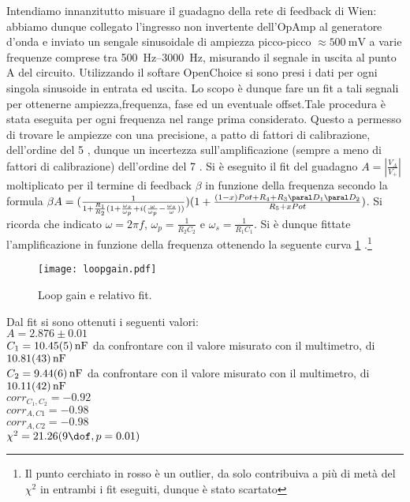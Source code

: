 Intendiamo innanzitutto misuare il guadagno della rete di feedback di Wien: abbiamo dunque collegato l'ingresso
non invertente dell'OpAmp al generatore d'onda e inviato un sengale sinusoidale di ampiezza picco-picco $\approx \SI{500}{\mV}$
a varie frequenze comprese tra \SIrange[range-phrase = \text{ e }]{500}{3000}{\Hz},
misurando il segnale in uscita al punto A del circuito. Utilizzando il softare OpenChoice si sono presi i dati per ogni singola sinusoide in entrata ed uscita. Lo scopo è dunque fare un fit a tali segnali per ottenerne ampiezza,frequenza, fase ed un eventuale offset.Tale procedura è stata eseguita per ogni frequenza nel range prima considerato. Questo a permesso di trovare le ampiezze con una precisione, a patto di fattori di calibrazione, dell'ordine del 5 \textperthousand , dunque un incertezza sull'amplificazione (sempre a meno di fattori di calibrazione) dell'ordine del 7 \textperthousand.
Si è eseguito il fit del guadagno $A=\left | \frac{V_A}{V_+} \right | $ moltiplicato per il termine di feedback $\beta$ in funzione della frequenza secondo la formula $\beta A= (\frac{1}{1+\frac{R_1}{R_2}(1+\frac{\omega_s}{\omega_p}+i(\frac{\omega}{\omega_p}-\frac{\omega_s}{\omega} ))})(1 + \frac{(1-x)Pot+R_4+R_3 \paral D_1 \paral D_2}{R_5+xPot})$. Si ricorda che indicato $\omega=2 \pi f$, $\omega_p= \frac{1}{R_2C_2}$ e $\omega_s=\frac{1}{R_1C_1}$. Si è dunque fittate l'amplificazione in funzione della frequenza ottenendo la seguente curva \ref{f:lpgn} .\footnote{Il punto cerchiato in rosso è un outlier, da solo contribuiva a più di metà del $\chi^2$ in entrambi i fit eseguiti, dunque è stato scartato}


\begin{figure}[h]
	\centering
	\texttt{[image: loopgain.pdf]}
	\caption{Loop gain e relativo fit.}
	\label{f:lpgn}
\end{figure}

Dal fit si sono ottenuti i seguenti valori:\\
$A=2.876 \pm 0.01$\\
$C_1=\SI{10.45 \pm 0.05}{nF}$ da confrontare con il valore misurato con il multimetro, di $\SI{10.81\pm 0.43}{nF}$\\
$C_2=\SI{9.44\pm 0.06}{nF}$ da confrontare con il valore misurato con il multimetro, di $\SI{10.11\pm 0.42}{nF}$\\
$corr_{C_1, C_2}=-0.92$\\
$corr_{A,C1}=-0.98$\\
$corr_{A,C2}=-0.98$\\
$\chi^2=21.26 (9 \dof, p = 0.01)$

